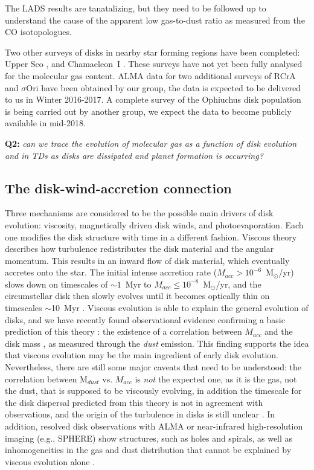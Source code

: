 \documentclass[10pt,fleqn,twoside]{article}
\begin{document}
The LADS results are tanatalizing, but they need to be followed up to understand the cause of the apparent low gas-to-dust ratio as measured from the CO isotopologues.

Two other surveys of disks in nearby star forming regions have been completed: Upper Sco \citep{2016ApJ...827..142B}, and Chamaeleon~I \citep{2016ApJ...831..125P}. These surveys have not yet been fully analysed for the molecular gas content. ALMA data for two additional surveys of RCrA and $\sigma$Ori have been obtained by our group, the data is expected to be delivered to us in Winter 2016-2017. A complete survey of the Ophiuchus disk population is being carried out by another group, we expect the data to become publicly available in mid-2018.

\smallskip
{\bf Q2:} {\it can we trace the evolution of molecular gas as a function of disk evolution and in TDs as disks are dissipated and planet formation is occurring?}

\subsection{The disk-wind-accretion connection}

Three mechanisms are considered to be the possible main drivers of disk evolution: viscosity,
magnetically driven disk winds, and photoevaporation. Each one modifies the disk structure with 
time in a different fashion. Viscous theory \citep[e.g.\ ][]{1974MNRAS.168..603L} describes how
turbulence redistributes the disk material and the angular momentum. This results in an inward 
flow of disk material, which eventually accretes onto the star. The initial intense accretion 
rate ($M_{acc}>10^{-6}$~M$_\odot$/yr)
slows down on timescales of $\sim 1$~Myr to $M_{acc}\le 10^{-8}$~M$_\odot$/yr,
and the circumstellar disk then slowly evolves until it 
becomes optically thin on timescales $\sim$10~Myr \citep[e.g.\ ][]{1998apsf.book.....H}. Viscous 
evolution is able to explain the general evolution of disks, and we have recently found observational
evidence confirming a basic prediction of this theory \citep[e.g.\ ][]{2006ApJ...645L..69D}: the existence of a correlation between $M_{acc}$ 
and the disk mass \citep{2016A&A...591L...3M}, as measured through the {\it dust} emission. This 
finding supports the idea that viscous evolution may be the main ingredient of early disk evolution.
Nevertheless, there are still some major caveats that need to be understood:
the correlation between  M$_{dust}$ vs. $M_{acc}$ is {\it not} the expected one, as it is the gas,
not the dust, that is supposed to be viscously evolving, in addition
the timescale for the disk dispersal predicted from this theory is not in agreement with 
observations, and the origin of the turbulence in disks is still unclear 
\citep[e.g.\ ][]{2014prpl.conf..411T}. In addition, resolved disk observations with ALMA or 
near-infrared high-resolution imaging (e.g., SPHERE) show structures, such as holes and 
spirals, as well as inhomogeneities in the gas and dust distribution that cannot be 
explained by viscous evolution alone \citep[e.g.\ ][]{2015A&A...578L...6B}. 
\end{document}
